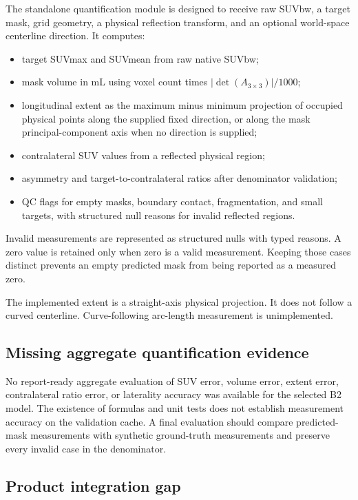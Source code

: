 \documentclass[11pt]{article}
\begin{document}
The standalone quantification module is designed to receive raw SUVbw, a target mask, grid geometry, a physical reflection transform, and an optional world-space centerline direction. It computes:

\begin{itemize}
  \item target SUVmax and SUVmean from raw native SUVbw;
  \item mask volume in mL using voxel count times $|\det(A_{3\times3})|/1000$;
  \item longitudinal extent as the maximum minus minimum projection of occupied physical points along the supplied fixed direction, or along the mask principal-component axis when no direction is supplied;
  \item contralateral SUV values from a reflected physical region;
  \item asymmetry and target-to-contralateral ratios after denominator validation;
  \item QC flags for empty masks, boundary contact, fragmentation, and small targets, with structured null reasons for invalid reflected regions.
\end{itemize}

Invalid measurements are represented as structured nulls with typed reasons. A zero value is retained only when zero is a valid measurement. Keeping those cases distinct prevents an empty predicted mask from being reported as a measured zero.

The implemented extent is a straight-axis physical projection. It does not follow a curved centerline. Curve-following arc-length measurement is unimplemented.

\subsection{Missing aggregate quantification evidence}

No report-ready aggregate evaluation of SUV error, volume error, extent error, contralateral ratio error, or laterality accuracy was available for the selected B2 model. The existence of formulas and unit tests does not establish measurement accuracy on the validation cache. A final evaluation should compare predicted-mask measurements with synthetic ground-truth measurements and preserve every invalid case in the denominator.

\subsection{Product integration gap}
\end{document}
